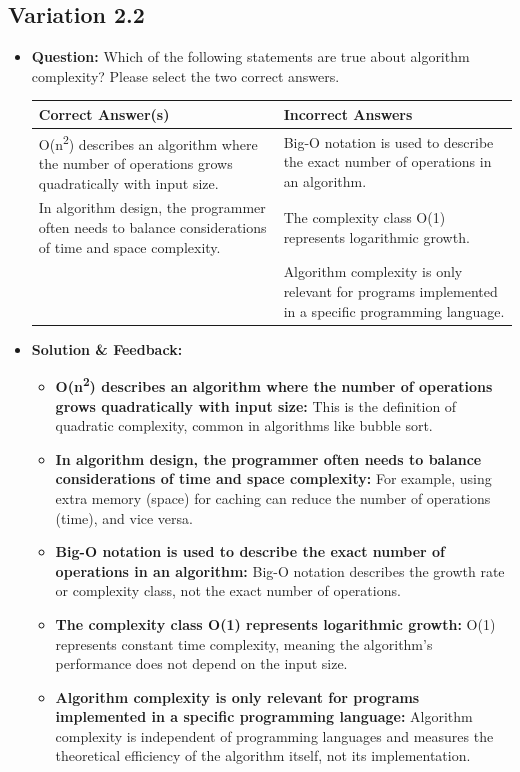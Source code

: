 \subsection{Variation 2.2}
\begin{itemize}
    \item \textbf{Question:} Which of the following statements are true about algorithm complexity? Please select the two correct answers.
    
    \begin{tabularx}{\textwidth}{|X|X|}
        \hline
        \textbf{Correct Answer(s)} & \textbf{Incorrect Answers} \\
        \hline
        O(n\textsuperscript{2}) describes an algorithm where the number of operations grows quadratically with input size. & Big-O notation is used to describe the exact number of operations in an algorithm. \\
        In algorithm design, the programmer often needs to balance considerations of time and space complexity. & The complexity class O(1) represents logarithmic growth. \\
         & Algorithm complexity is only relevant for programs implemented in a specific programming language. \\
        \hline
    \end{tabularx}
    
    \item \textbf{Solution \& Feedback:}
    \begin{itemize}
        \item \textbf{O(n\textsuperscript{2}) describes an algorithm where the number of operations grows quadratically with input size:} This is the definition of quadratic complexity, common in algorithms like bubble sort.
        \item \textbf{In algorithm design, the programmer often needs to balance considerations of time and space complexity:} For example, using extra memory (space) for caching can reduce the number of operations (time), and vice versa.
        \item \textbf{Big-O notation is used to describe the exact number of operations in an algorithm:} Big-O notation describes the growth rate or complexity class, not the exact number of operations.
        \item \textbf{The complexity class O(1) represents logarithmic growth:} O(1) represents constant time complexity, meaning the algorithm's performance does not depend on the input size.
        \item \textbf{Algorithm complexity is only relevant for programs implemented in a specific programming language:} Algorithm complexity is independent of programming languages and measures the theoretical efficiency of the algorithm itself, not its implementation.
    \end{itemize}
\end{itemize}

